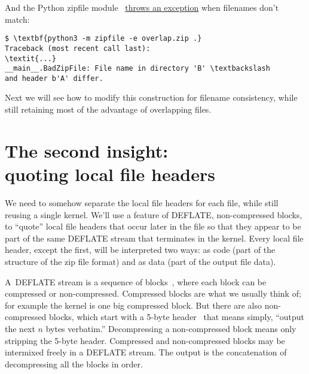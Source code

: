 \documentclass[letterpaper,twocolumn,10pt]{article}
\begin{document}
\noindent
And the Python zipfile module~\cite{python-zipfile}
\href{https://github.com/python/cpython/blob/v3.7.0/Lib/zipfile.py#L1486-L1489}{throws an exception}
when filenames don't match:

{\small
\begin{Verbatim}[commandchars=\\\{\}]
$ \textbf{python3 -m zipfile -e overlap.zip .}
Traceback (most recent call last):
\textit{...}
__main__.BadZipFile: File name in directory 'B' \textbackslash
and header b'A' differ.
\end{Verbatim}
}

Next we will see how to modify this construction
for filename consistency,
while still retaining most of the advantage
of overlapping files.




\section{The second insight:\\quoting local file headers}
\label{sec:quote}

We need to somehow separate the local file headers for each file,
while still reusing a single kernel.
We'll use a feature of DEFLATE, non-compressed blocks,
to ``quote'' local file headers that occur later in the file
so that they appear to be part of the same DEFLATE stream
that terminates in the kernel.
Every local file header,
except the first,
will be interpreted two ways:
as code (part of the structure of the zip file format)
and as data (part of the output file data).

A~DEFLATE stream is a sequence of
blocks~\cite[\S 3.2.3]{rfc1951},
where each block can be compressed or non-compressed.
Compressed blocks are what we usually think of;
for example the kernel is one big compressed block.
But there are also non-compressed blocks,
which start with a
5-byte header~\cite[\S 3.2.4]{rfc1951}
that means simply, ``output the next $n$ bytes verbatim.''
Decompressing a non-compressed block means only stripping the 5-byte header.
Compressed and non-compressed blocks may be intermixed freely
in a DEFLATE stream.
The output is the concatenation of
decompressing all the blocks in order.
\end{document}
